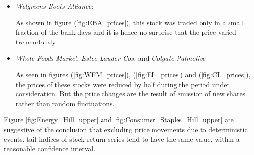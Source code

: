 \documentclass{article}
\newcommand{\1}[1]{
  \mathbf{1}_{\{#1\}}
}
\begin{document}
\begin{itemize}
\item {\it Walgreens Boots Alliance}:

  As shown in figure (\ref{fig:EBA_prices}),
  this stock was traded only in a small fraction of the bank
  days and it is hence no surprise that the price varied
  tremendously.
\item {\it Whole Foods Market}, {\it Estee Lauder Cos.} and {\it
  Colgate-Palmolive}
  
  As seen in figures (\ref{fig:WFM_prices}), (\ref{fig:EL_prices}) and
  (\ref{fig:CL_prices}),
  the prices of these stocks were reduced by half during the
  period under consideration. But the price changes are the
  result of emission of new shares rather than random fluctuations.
\end{itemize}

Figure \ref{fig:Energy_Hill_upper} and
\ref{fig:Consumer_Staples_Hill_upper}
are suggestive of the conclusion that excluding price
movements due to deterministic events, tail indices of stock return
series tend to have the same value, within a reasonable confidence
interval.
\end{document}
